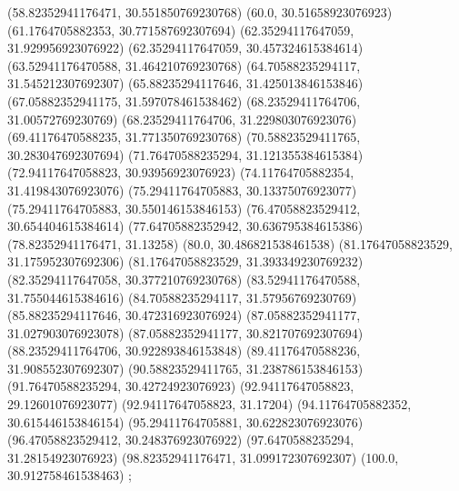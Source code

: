 {{{		(58.82352941176471, 30.551850769230768)
		(60.0, 30.51658923076923)
		(61.1764705882353, 30.771587692307694)
		(62.35294117647059, 31.929956923076922)
		(62.35294117647059, 30.457324615384614)
		(63.52941176470588, 31.464210769230768)
		(64.70588235294117, 31.545212307692307)
		(65.88235294117646, 31.425013846153846)
		(67.05882352941175, 31.597078461538462)
		(68.23529411764706, 31.00572769230769)
		(68.23529411764706, 31.229803076923076)
		(69.41176470588235, 31.771350769230768)
		(70.58823529411765, 30.283047692307694)
		(71.76470588235294, 31.121355384615384)
		(72.94117647058823, 30.93956923076923)
		(74.11764705882354, 31.419843076923076)
		(75.29411764705883, 30.13375076923077)
		(75.29411764705883, 30.550146153846153)
		(76.47058823529412, 30.654404615384614)
		(77.64705882352942, 30.636795384615386)
		(78.82352941176471, 31.13258)
		(80.0, 30.486821538461538)
		(81.17647058823529, 31.175952307692306)
		(81.17647058823529, 31.393349230769232)
		(82.35294117647058, 30.377210769230768)
		(83.52941176470588, 31.755044615384616)
		(84.70588235294117, 31.57956769230769)
		(85.88235294117646, 30.472316923076924)
		(87.05882352941177, 31.027903076923078)
		(87.05882352941177, 30.821707692307694)
		(88.23529411764706, 30.922893846153848)
		(89.41176470588236, 31.908552307692307)
		(90.58823529411765, 31.238786153846153)
		(91.76470588235294, 30.42724923076923)
		(92.94117647058823, 29.12601076923077)
		(92.94117647058823, 31.17204)
		(94.11764705882352, 30.615446153846154)
		(95.29411764705881, 30.622823076923076)
		(96.47058823529412, 30.248376923076922)
		(97.6470588235294, 31.28154923076923)
		(98.82352941176471, 31.099172307692307)
		(100.0, 30.912758461538463)
	};

}}
